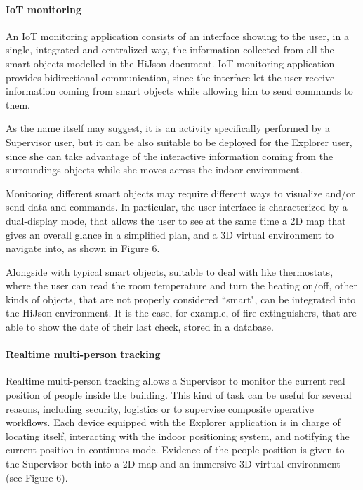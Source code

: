 \documentclass{sig-alternate}
\begin{document}
\paragraph{IoT monitoring}

An IoT monitoring application consists of an interface showing to the user, in a single, integrated and centralized way, the information collected from all the smart objects modelled in the HiJson document. IoT monitoring application provides bidirectional communication, since the interface let the user receive information coming from smart objects while allowing him to send commands to them.

As the name itself may suggest, it is an activity specifically performed by a Supervisor user, but it can be also suitable to be deployed for the Explorer user, since she can take advantage of the interactive information coming from the surroundings objects while she moves across the indoor environment.

Monitoring different smart objects may require different ways to visualize and/or send data and commands. In particular, the user interface is characterized by a dual-display mode, that allows the user to see at the same time a 2D map that gives an overall glance in a simplified plan, and a 3D virtual environment to navigate into, as shown in Figure 6.

Alongside with typical smart objects, suitable to deal with like thermostats, where the user can read the room temperature and turn the heating on/off, other kinds of objects, that are not properly considered ``smart", can be integrated into the HiJson environment. It is the case, for example, of fire extinguishers, that are able to show the date of their last check, stored in a database.

\paragraph{Realtime multi-person tracking}
Realtime multi-person tracking allows a Supervisor to monitor the current real position of people inside the building. This kind of task can be useful for several reasons, including security, logistics or to supervise composite operative workflows. Each device equipped with the Explorer application is in charge of locating itself, interacting with the indoor positioning system, and notifying the current position in continuos mode. Evidence of the people position is given to the Supervisor both into a 2D map and an immersive 3D virtual environment (see Figure 6).
\end{document}
